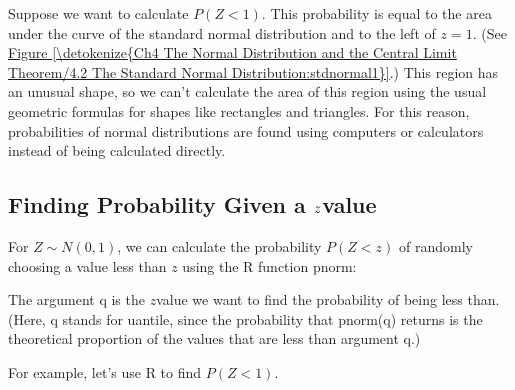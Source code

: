 \documentclass[letterpaper,10pt,english]{jupyterBook}
\begin{document}
\sphinxAtStartPar
Suppose we want to calculate \(P(Z < 1)\). This probability is equal to the area under the curve of the standard normal distribution and to the left of \(z = 1\). (See \hyperref[\detokenize{Ch4 The Normal Distribution and the Central Limit Theorem/4.2 The Standard Normal Distribution:stdnormal1}]{Figure \ref{\detokenize{Ch4 The Normal Distribution and the Central Limit Theorem/4.2 The Standard Normal Distribution:stdnormal1}}}.) This region has an unusual shape, so we can’t calculate the area of this region using the usual geometric formulas for shapes like rectangles and triangles. For this reason, probabilities of normal distributions are found using computers or calculators instead of being calculated directly.


\subsection{Finding Probability Given a \protect\(z\protect\)\sphinxhyphen{}value}
\label{\detokenize{Ch4 The Normal Distribution and the Central Limit Theorem/4.2 The Standard Normal Distribution:finding-probability-given-a-z-value}}
\sphinxAtStartPar
For \(Z\sim N(0, 1)\), we can calculate the probability \(P(Z < z)\) of randomly choosing a value less than \(z\) using the R function pnorm:

\begin{sphinxVerbatim}[commandchars=\\\{\}]
\end{sphinxVerbatim}

\sphinxAtStartPar
The argument q is the \(z\)\sphinxhyphen{}value we want to find the probability of being less than. (Here, q stands for uantile, since the probability that pnorm(q) returns is the theoretical proportion of the values that are less than argument q.)

\sphinxAtStartPar
For example, let’s use R to find \(P(Z < 1)\).
\end{document}
